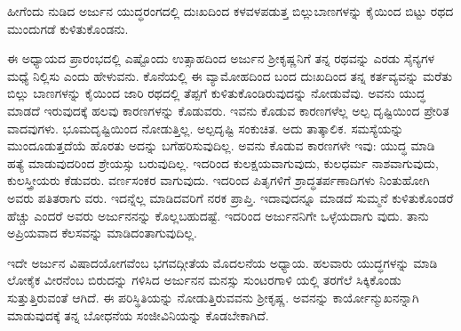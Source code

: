 {\small ಹೀಗೆಂದು ನುಡಿದ ಅರ್ಜುನ ಯುದ್ಧರಂಗದಲ್ಲಿ ದುಃಖದಿಂದ ಕಳವಳಪಡುತ್ತ ಬಿಲ್ಲುಬಾಣಗಳನ್ನು ಕೈಯಿಂದ ಬಿಟ್ಟು ರಥದ ಮುಂದುಗಡೆ ಕುಳಿತುಕೊಂಡನು.}

ಈ ಅಧ್ಯಾಯದ ಪ್ರಾರಂಭದಲ್ಲಿ ಎಷ್ಟೊಂದು ಉತ್ಸಾಹದಿಂದ ಅರ್ಜುನ ಶ್ರೀಕೃಷ್ಣನಿಗೆ ತನ್ನ ರಥವನ್ನು ಎರಡು ಸೈನ್ಯಗಳ ಮಧ್ಯೆ ನಿಲ್ಲಿಸು ಎಂದು ಹೇಳುವನು. ಕೊನೆಯಲ್ಲಿ ಈ ವ್ಯಾಮೋಹದಿಂದ ಬಂದ ದುಃಖದಿಂದ ತನ್ನ ಕರ್ತವ್ಯವನ್ನು ಮರೆತು ಬಿಲ್ಲು ಬಾಣಗಳನ್ನು ಕೈಯಿಂದ ಜಾರಿ ರಥದಲ್ಲಿ ತೆಪ್ಪಗೆ ಕುಳಿತುಕೊಂಡಿರುವುದನ್ನು ನೋಡುವೆವು. ಅವನು ಯುದ್ಧ ಮಾಡದೆ ಇರುವುದಕ್ಕೆ ಹಲವು ಕಾರಣಗಳನ್ನು ಕೊಡುವರು. ಇವನು ಕೊಡುವ ಕಾರಣಗಳೆಲ್ಲ ಅಲ್ಪ ದೃಷ್ಟಿಯಿಂದ ಪ್ರೇರಿತ ವಾದವುಗಳು. ಭೂಮದೃಷ್ಟಿಯಿಂದ ನೋಡುತ್ತಿಲ್ಲ. ಅಲ್ಪದೃಷ್ಟಿ ಸಂಕುಚಿತ. ಅದು ತಾತ್ಕಾಲಿಕ. ಸಮಸ್ಯೆಯನ್ನು ಮುಂದೂಡುತ್ತದೆಯೆ ಹೊರತು ಅದನ್ನು ಬಗೆಹರಿಸುವುದಿಲ್ಲ. ಅವನು ಕೊಡುವ ಕಾರಣಗಳೇ ಇವು: ಯುದ್ಧ ಮಾಡಿ ಹತ್ಯೆ ಮಾಡುವುದರಿಂದ ಶ್ರೇಯಸ್ಸು ಬರುವುದಿಲ್ಲ. ಇದರಿಂದ ಕುಲಕ್ಷಯವಾಗುವುದು, ಕುಲಧರ್ಮ ನಾಶವಾಗುವುದು, ಕುಲಸ್ತ್ರೀಯರು ಕೆಡುವರು. ವರ್ಣಸಂಕರ ವಾಗುವುದು. ಇದರಿಂದ ಪಿತೃಗಳಿಗೆ ಶ್ರಾದ್ಧತರ್ಪಣಾದಿಗಳು ನಿಂತುಹೋಗಿ ಅವರು ಪತಿತರಾಗು ವರು. ಇದನ್ನೆಲ್ಲ ಮಾಡಿದವರಿಗೆ ನರಕ ಪ್ರಾಪ್ತಿ. ಇದಾವುದನ್ನೂ ಮಾಡದೆ ಸುಮ್ಮನೆ ಕುಳಿತುಕೊಂಡರೆ ಹೆಚ್ಚು ಎಂದರೆ ಅವರು ಅರ್ಜುನನನ್ನು ಕೊಲ್ಲಬಹುದಷ್ಟೆ. ಇದರಿಂದ ಅರ್ಜುನನಿಗೇ ಒಳ್ಳೆಯದಾಗು ವುದು. ತಾನು ಅಪ್ರಿಯವಾದ ಕೆಲಸವನ್ನು ಮಾಡಿದಂತಾಗುವುದಿಲ್ಲ.

ಇದೇ ಅರ್ಜುನ ವಿಷಾದಯೋಗವೆಂಬ ಭಗವದ್ಗೀತೆಯ ಮೊದಲನೆಯ ಅಧ್ಯಾಯ. ಹಲವಾರು ಯುದ್ಧಗಳನ್ನು ಮಾಡಿ ಲೋಕೈಕ ವೀರನೆಂಬ ಬಿರುದನ್ನು ಗಳಿಸಿದ ಅರ್ಜುನನ ಮನಸ್ಸು ಸುಂಟರಗಾಳಿ ಯಲ್ಲಿ ತರಗೆಲೆ ಸಿಕ್ಕಿಕೊಂಡು ಸುತ್ತುತ್ತಿರುವಂತೆ ಆಗಿದೆ. ಈ ಪರಿಸ್ಥಿತಿಯನ್ನು ನೋಡುತ್ತಿರುವವನು ಶ್ರೀಕೃಷ್ಣ. ಅವನನ್ನು ಕಾರ್ಯೋನ್ಮುಖನನ್ನಾಗಿ ಮಾಡುವುದಕ್ಕೆ ತನ್ನ ಬೋಧನೆಯ ಸಂಜೀವಿನಿಯನ್ನು ಕೊಡಬೇಕಾಗಿದೆ.

